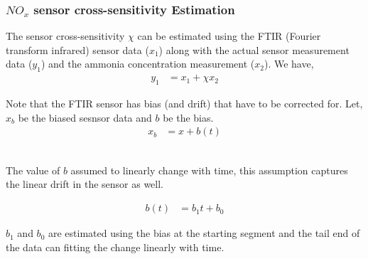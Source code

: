 \subsubsection{$NO_x$ sensor cross-sensitivity Estimation}

The sensor cross-sensitivity $\chi$ can be estimated using the FTIR (Fourier
transform infrared) sensor data ($x_1$) along with the actual sensor measurement
data ($y_1$) and the ammonia concentration measurement ($x_2$). We have,
\begin{align*}
    y_1 &= x_1 + \chi x_2
\end{align*}

Note that the FTIR sensor has bias (and drift) that have to be corrected for.
Let, $x_b$ be the biased sesnsor data and $b$ be the bias.
\begin{align*}
    x_b &= x + b(t)
\end{align*}

\\
The value of $b$ assumed to linearly change with time, this assumption captures
the linear drift in the sensor as well.

\begin{align*}
    b(t) &= b_1 t + b_0
\end{align*}

$b_1$ and $b_0$ are estimated using the bias at the starting segment and the
tail end of the data can fitting the change linearly with time.

